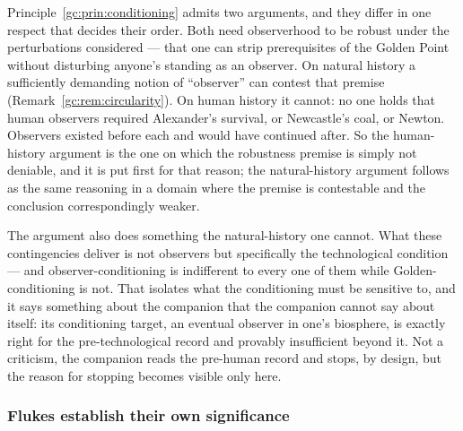 \documentclass[11pt]{article}
\numberwithin{equation}{section}
\theoremstyle{plain}
\theoremstyle{definition}
\theoremstyle{remark}
\begin{document}
Principle~\ref{gc:prin:conditioning} admits two arguments, and they
differ in one respect that decides their order. Both need observerhood
to be robust under the perturbations considered --- that one can strip
prerequisites of the Golden Point without disturbing anyone's standing
as an observer. On natural history a sufficiently demanding notion of
``observer'' can contest that premise (Remark~\ref{gc:rem:circularity}).
On human history it cannot: no one holds that human observers required
Alexander's survival, or Newcastle's coal, or Newton. Observers existed
before each and would have continued after. So the human-history
argument is the one on which the robustness premise is simply not
deniable, and it is put first for that reason; the natural-history
argument follows as the same reasoning in a domain where the premise is
contestable and the conclusion correspondingly weaker.

The argument also does something the natural-history one cannot. What
these contingencies deliver is not observers but specifically the
technological condition --- and observer-conditioning is indifferent to
every one of them while Golden-conditioning is not. That isolates what
the conditioning must be sensitive to, and it says something about the
companion that the companion cannot say about itself: its
conditioning target, an eventual observer in one's biosphere, is exactly
right for the pre-technological record and provably insufficient beyond
it. Not a criticism, the companion reads the pre-human record and
stops, by design, but the reason for stopping becomes visible only
here.

\subsubsection{Flukes establish their own significance}
\label{gc:subsub:flukes}
\end{document}
